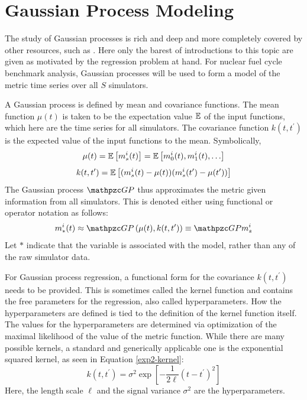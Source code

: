 \section{Gaussian Process Modeling}
\label{gp}
The study of Gaussian processes is rich and deep and more completely covered by 
other resources, such as \cite{rasmussen2006gaussian}. Here only the barest of 
introductions to this topic are given as motivated by the regression problem at
hand. For nuclear fuel cycle benchmark analysis, Gaussian processes will be used
to form a model of the metric time series over all $S$ simulators. 

A Gaussian process is defined by mean and covariance functions. 
The mean function $\mu(t)$ is taken to be the expectation value $\mathbb{E}$ of 
the input functions, which here are the time series for all simulators. The
covariance function $k(t, t^\prime)$ is the expected value of the input 
functions to the mean. Symbolically, 
\begin{equation}
\label{mean-func}
\mu(t) = \mathbb{E}\left[m_s^i(t)\right] = \mathbb{E}\left[m_0^i(t), m_1^i(t), \ldots\right]
\end{equation}
\begin{equation}
\label{covar-func}
k(t, t^\prime) = \mathbb{E}\left[(m_s^i(t) - \mu(t))(m_s^i(t^\prime) - \mu(t^\prime))\right]
\end{equation}
The Gaussian process $\GP$ thus approximates the metric given information 
from all simulators. This is denoted either using functional or operator notation as follows:
\begin{equation}
\label{gp-def-approx}
m_*^i(t) \approx \GP\left(\mu(t), k(t, t^\prime)\right) \equiv \GP m_s^i
\end{equation}
Let $*$ indicate that the variable is associated with  
the model, rather than any of the raw simulator data.


For Gaussian process regression, a functional form for the covariance 
$k(t, t^\prime)$ needs to be provided.
This is sometimes called the kernel function and contains the free parameters 
for the regression, also called hyperparameters. How the hyperparameters are 
defined is 
tied to the definition of the kernel function itself. The values for the 
hyperparameters are determined
via optimization of the maximal likelihood of the value of the metric function.
While there are many possible kernels, a standard and generically applicable one 
is the exponential squared kernel, as seen in Equation \ref{exp2-kernel}:
\begin{equation}
\label{exp2-kernel}
k(t, t^\prime) = \sigma^2 \exp\left[-\frac{1}{2\ell}(t - t^\prime)^2 \right]
\end{equation}
Here, the length scale $\ell$ and the signal variance $\sigma^2$ are the 
hyperparameters.

